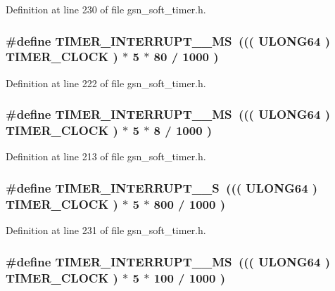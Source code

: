Definition at line 230 of file gsn\_\-soft\_\-timer.h.

\hypertarget{a00673_ga876a37d4588162417327081c31249a09}{
\subsubsection[{TIMER\_\-INTERRUPT\_\-400\_\-MS}]{\setlength{\rightskip}{0pt plus 5cm}\#define TIMER\_\-INTERRUPT\_\_\-MS~((( {\bf ULONG64} ) TIMER\_\-CLOCK ) $\ast$ 5 $\ast$ 80 / 1000 )}}
\label{a00673_ga876a37d4588162417327081c31249a09}


Definition at line 222 of file gsn\_\-soft\_\-timer.h.

\hypertarget{a00673_ga13b2586797ac950024aa46134ba569ab}{
\subsubsection[{TIMER\_\-INTERRUPT\_\-40\_\-MS}]{\setlength{\rightskip}{0pt plus 5cm}\#define TIMER\_\-INTERRUPT\_\_\-MS~((( {\bf ULONG64} ) TIMER\_\-CLOCK ) $\ast$ 5 $\ast$ 8 / 1000 )}}
\label{a00673_ga13b2586797ac950024aa46134ba569ab}


Definition at line 213 of file gsn\_\-soft\_\-timer.h.

\hypertarget{a00673_gaab56eb2c0a9908dff18f586c3b83c0e9}{
\subsubsection[{TIMER\_\-INTERRUPT\_\-4\_\-S}]{\setlength{\rightskip}{0pt plus 5cm}\#define TIMER\_\-INTERRUPT\_\_\-S~((( {\bf ULONG64} ) TIMER\_\-CLOCK ) $\ast$ 5 $\ast$ 800 / 1000 )}}
\label{a00673_gaab56eb2c0a9908dff18f586c3b83c0e9}


Definition at line 231 of file gsn\_\-soft\_\-timer.h.

\hypertarget{a00673_gaa2d9363dd86d3618f88763c9a220b7a6}{
\subsubsection[{TIMER\_\-INTERRUPT\_\-500\_\-MS}]{\setlength{\rightskip}{0pt plus 5cm}\#define TIMER\_\-INTERRUPT\_\_\-MS~((( {\bf ULONG64} ) TIMER\_\-CLOCK ) $\ast$ 5 $\ast$ 100 / 1000 )}}
\label{a00673_gaa2d9363dd86d3618f88763c9a220b7a6}


